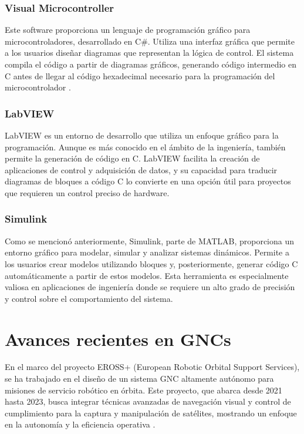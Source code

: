 \subsubsection{Visual Microcontroller}
Este software proporciona un lenguaje de programación gráfico para microcontroladores, desarrollado en C\#. Utiliza una interfaz gráfica que permite a los 
usuarios diseñar diagramas que representan la lógica de control. El sistema compila el código a partir de diagramas gráficos, generando código intermedio 
en C antes de llegar al código hexadecimal necesario para la programación del microcontrolador \cite{Sacta2011DesarrolloDU}.


\subsubsection{LabVIEW}

LabVIEW es un entorno de desarrollo que utiliza un enfoque gráfico para la programación. Aunque es más conocido en el ámbito de la ingeniería, también 
permite la generación de código en C. LabVIEW facilita la creación de aplicaciones de control y adquisición de datos, y su capacidad para traducir 
diagramas de bloques a código C lo convierte en una opción útil para proyectos que requieren un control preciso de hardware.

\subsubsection{Simulink}
Como se mencionó anteriormente, Simulink, parte de MATLAB, proporciona un entorno gráfico para modelar, simular y analizar sistemas dinámicos. 
Permite a los usuarios crear modelos utilizando bloques y, posteriormente, generar código C automáticamente a partir de estos modelos. Esta 
herramienta es especialmente valiosa en aplicaciones de ingeniería donde se requiere un alto grado de precisión y control sobre el 
comportamiento del sistema.

\section{Avances recientes en GNCs }

En el marco del proyecto EROSS+ (European Robotic Orbital Support Services), se ha trabajado en el diseño de un sistema GNC altamente autónomo 
para misiones de servicio robótico en órbita. Este proyecto, que abarca desde 2021 hasta 2023, busca integrar técnicas avanzadas de navegación 
visual y control de cumplimiento para la captura y manipulación de satélites, mostrando un enfoque en la autonomía y la eficiencia operativa \cite{Casu2023EROSSPA}.

